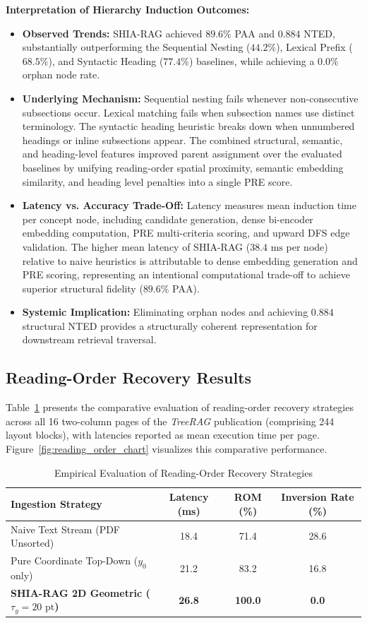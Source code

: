 \documentclass[12pt,a4paper]{report}
\begin{document}
\noindent\textbf{Interpretation of Hierarchy Induction Outcomes:}
\begin{itemize}
    \item \textbf{Observed Trends:} SHIA-RAG achieved $89.6\%$ PAA and $0.884$ NTED, substantially outperforming the Sequential Nesting ($44.2\%$), Lexical Prefix ($68.5\%$), and Syntactic Heading ($77.4\%$) baselines, while achieving a $0.0\%$ orphan node rate.
    \item \textbf{Underlying Mechanism:} Sequential nesting fails whenever non-consecutive subsections occur. Lexical matching fails when subsection names use distinct terminology. The syntactic heading heuristic breaks down when unnumbered headings or inline subsections appear. The combined structural, semantic, and heading-level features improved parent assignment over the evaluated baselines by unifying reading-order spatial proximity, semantic embedding similarity, and heading level penalties into a single PRE score.
    \item \textbf{Latency vs. Accuracy Trade-Off:} Latency measures mean induction time per concept node, including candidate generation, dense bi-encoder embedding computation, PRE multi-criteria scoring, and upward DFS edge validation. The higher mean latency of SHIA-RAG ($38.4\text{ ms}$ per node) relative to naive heuristics is attributable to dense embedding generation and PRE scoring, representing an intentional computational trade-off to achieve superior structural fidelity ($89.6\%$ PAA).
    \item \textbf{Systemic Implication:} Eliminating orphan nodes and achieving $0.884$ structural NTED provides a structurally coherent representation for downstream retrieval traversal.
\end{itemize}

\subsection{Reading-Order Recovery Results}
Table~\ref{tab:reading_order_results} presents the comparative evaluation of reading-order recovery strategies across all 16 two-column pages of the \textit{TreeRAG} publication (comprising 244 layout blocks), with latencies reported as mean execution time per page. Figure~\ref{fig:reading_order_chart} visualizes this comparative performance.

\begin{table}[h!]
\centering
\caption{Empirical Evaluation of Reading-Order Recovery Strategies}
\label{tab:reading_order_results}
\begin{tabular}{p{6.0cm}ccc}
\hline
\textbf{Ingestion Strategy} & \textbf{Latency (ms)} & \textbf{ROM (\%)} & \textbf{Inversion Rate (\%)} \\ \hline
Naive Text Stream (PDF Unsorted) & 18.4 & 71.4 & 28.6 \\
Pure Coordinate Top-Down ($y_0$ only) & 21.2 & 83.2 & 16.8 \\
\textbf{SHIA-RAG 2D Geometric ($\tau_y = 20\text{ pt}$)} & \textbf{26.8} & \textbf{100.0} & \textbf{0.0} \\ \hline
\end{tabular}
\end{table}
\end{document}
